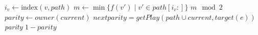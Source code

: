 \begin{algorithm}[H]
    \caption{DFS Get Play Parity}
    \begin{algorithmic}[1]

            \State $i_v \gets \text{index}(v, path)$
            \State $m \gets \min\{f(v') \mid v' \in path[i_v:]\}$
            \State \Return $m \mod 2$
        \Else
            \State $parity \gets \textit{owner}(current) $
                \State $nextparity = getPlay(path \cup current, target(e))$
                    \State \Return \textit{parity}
                \EndIf
            \EndFor
            \State \Return $1-\textit{parity}$
        \EndIf
    \EndFunction
    \end{algorithmic}
    \label{alg:hra}
\end{algorithm}